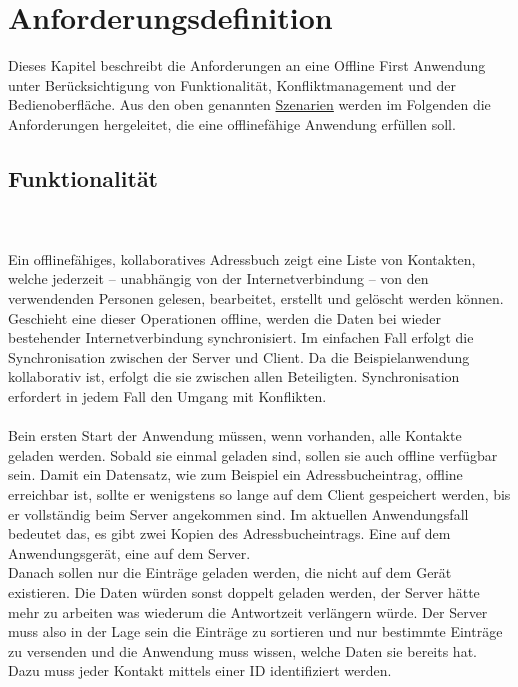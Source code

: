 \chapter{\label{chap:anforderungen}Anforderungsdefinition}
Dieses Kapitel beschreibt die Anforderungen an eine Offline First Anwendung unter Berücksichtigung von Funktionalität, Konfliktmanagement und der Bedienoberfläche.
Aus den oben genannten \hyperref[chap:szenarien]{Szenarien} werden im Folgenden die Anforderungen hergeleitet, die eine offlinefähige Anwendung erfüllen soll.
%
%

%
%
\section{Funktionalität}
\\\\
Ein offlinefähiges, kollaboratives Adressbuch zeigt eine Liste von Kontakten, welche jederzeit -- unabhängig von der Internetverbindung -- von den verwendenden Personen gelesen, bearbeitet, erstellt und gelöscht werden können.
Geschieht eine dieser Operationen offline, werden die Daten bei wieder bestehender Internetverbindung synchronisiert. Im einfachen Fall erfolgt die Synchronisation zwischen der Server und Client. Da die Beispielanwendung kollaborativ ist, erfolgt die sie zwischen allen Beteiligten. Synchronisation erfordert in jedem Fall den Umgang mit Konflikten.\\\\
%
Bein ersten Start der Anwendung müssen, wenn vorhanden, alle Kontakte geladen werden. Sobald sie einmal geladen sind, sollen sie auch offline verfügbar sein.
Damit ein Datensatz, wie zum Beispiel ein Adressbucheintrag, offline erreichbar ist, sollte er wenigstens so lange auf dem Client gespeichert werden, bis er vollständig beim Server angekommen sind. Im aktuellen Anwendungsfall bedeutet das, es gibt zwei Kopien des Adressbucheintrags. Eine auf dem Anwendungsgerät, eine auf dem Server.\\
Danach sollen nur die Einträge geladen werden, die nicht auf dem Gerät existieren.
Die Daten würden sonst doppelt geladen werden, der Server hätte mehr zu arbeiten was wiederum die Antwortzeit verlängern würde.
Der Server muss also in der Lage sein die Einträge zu sortieren und nur bestimmte Einträge zu versenden und die Anwendung muss wissen, welche Daten sie bereits hat. Dazu muss jeder Kontakt mittels einer ID identifiziert werden.\\
